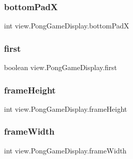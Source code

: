 \subsubsection{\texorpdfstring{bottom\+PadX}{bottomPadX}}
{\footnotesize\ttfamily int view.\+Pong\+Game\+Display.\+bottom\+PadX\hspace{0.3cm}{\ttfamily [private]}}

\hypertarget{classview_1_1_pong_game_display_aeb378cbf5a0a37e9105c9748910f3513}{}\label{classview_1_1_pong_game_display_aeb378cbf5a0a37e9105c9748910f3513} 
\subsubsection{\texorpdfstring{first}{first}}
{\footnotesize\ttfamily boolean view.\+Pong\+Game\+Display.\+first\hspace{0.3cm}{\ttfamily [private]}}

\hypertarget{classview_1_1_pong_game_display_a1263ea81d63ff3e12b37fee42225a22e}{}\label{classview_1_1_pong_game_display_a1263ea81d63ff3e12b37fee42225a22e} 
\subsubsection{\texorpdfstring{frame\+Height}{frameHeight}}
{\footnotesize\ttfamily int view.\+Pong\+Game\+Display.\+frame\+Height\hspace{0.3cm}{\ttfamily [private]}}

\hypertarget{classview_1_1_pong_game_display_aacbf5c26433ea74107021b461af657c1}{}\label{classview_1_1_pong_game_display_aacbf5c26433ea74107021b461af657c1} 
\subsubsection{\texorpdfstring{frame\+Width}{frameWidth}}
{\footnotesize\ttfamily int view.\+Pong\+Game\+Display.\+frame\+Width\hspace{0.3cm}{\ttfamily [private]}}

